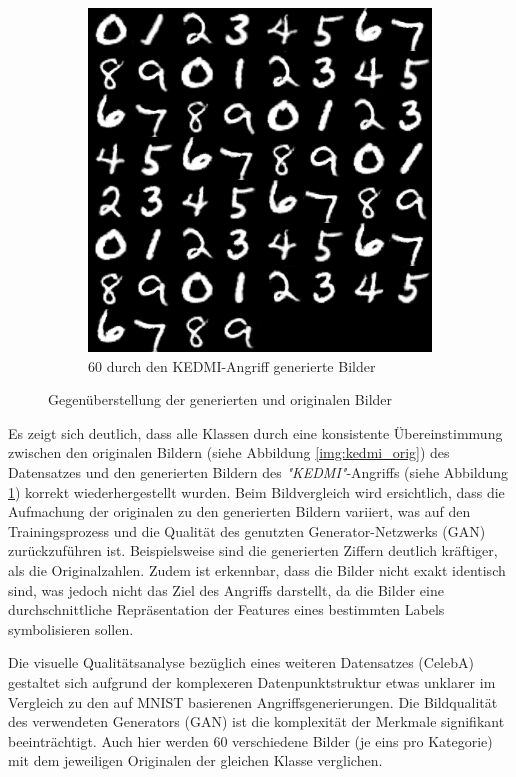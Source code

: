 \begin{figure}[H]
\begin{subfigure}[b]{0.348\linewidth}
		\includegraphics[width=\linewidth]{Bilder/kedmi_mnist.png}
		\caption{60 durch den \glqq KEDMI\grqq-Angriff generierte Bilder}
		\label{img:kedmi_gen}
	\end{subfigure}
	\caption{Gegenüberstellung der generierten und originalen Bilder}
	\label{img:kedmi_visual}
\end{figure}

Es zeigt sich deutlich, dass alle Klassen durch eine konsistente Übereinstimmung zwischen den originalen Bildern (siehe Abbildung \ref{img:kedmi_orig}) des Datensatzes und den generierten Bildern des \textit{"KEDMI"}-Angriffs (siehe Abbildung \ref{img:kedmi_gen}) korrekt wiederhergestellt wurden. Beim Bildvergleich wird ersichtlich, dass die Aufmachung der originalen zu den generierten Bildern variiert, was auf den Trainingsprozess und die Qualität des genutzten Generator-Netzwerks (GAN) zurückzuführen ist. Beispielsweise sind die generierten Ziffern deutlich kräftiger, als die Originalzahlen. Zudem ist erkennbar, dass die Bilder nicht exakt identisch sind, was jedoch nicht das Ziel des Angriffs darstellt, da die Bilder eine durchschnittliche Repräsentation der Features eines bestimmten Labels symbolisieren sollen.

Die visuelle Qualitätsanalyse bezüglich eines weiteren Datensatzes (CelebA) gestaltet sich aufgrund der komplexeren Datenpunktstruktur etwas unklarer im Vergleich zu den auf MNIST basierenen Angriffsgenerierungen. Die Bildqualität des verwendeten Generators (GAN) ist die komplexität der Merkmale signifikant beeinträchtigt. Auch hier werden 60 verschiedene Bilder (je eins pro Kategorie) mit dem jeweiligen Originalen der gleichen Klasse verglichen.

